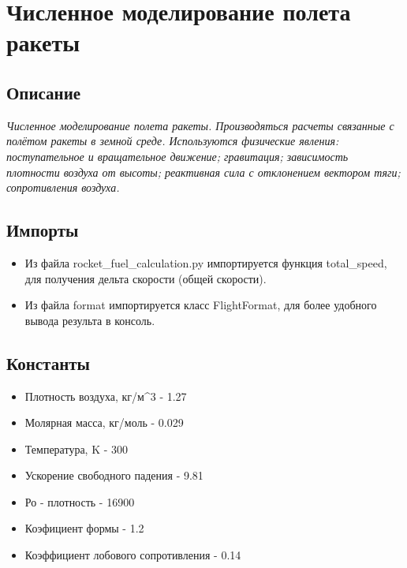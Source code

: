\documentclass[a4paper, 12pt]{report}
\begin{document}
\chapter{Численное моделирование полета ракеты}
\section{Описание}
\textit{Численное моделирование полета ракеты. Производяться расчеты связанные с полётом ракеты в земной среде. Используются физические явления: поступательное и вращательное движение; гравитация; зависимость плотности воздуха от высоты; реактивная сила с отклонением вектором тяги; сопротивления воздуха.}
\section{Импорты}
\begin{itemize}
    \item Из файла rocket\_fuel\_calculation.py импортируется функция total\_speed, для получения дельта скорости (общей скорости).
    \item Из файла format импортируется класс FlightFormat, для более удобного вывода результа в консоль.
\end{itemize}
\section{Константы}
\begin{itemize}
    \item Плотность воздуха, кг/м^{3} - 1.27
    \item Молярная масса, кг/моль - 0.029
    \item Температура, K - 300
    \item Ускорение свободного падения - 9.81
    \item Ро - плотность - 16900
    \item Коэфициент формы - 1.2
    \item Коэффициент лобового сопротивления - 0.14
\end{itemize}
\end{document}

